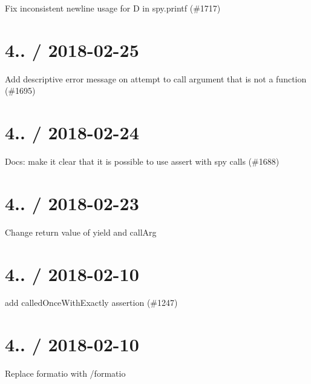 \begin{DoxyItemize}
\item Fix inconsistent newline usage for D in spy.\+printf (\#1717)
\end{DoxyItemize}

\section*{4.. / 2018-\/02-\/25 }


\begin{DoxyItemize}
\item Add descriptive error message on attempt to call argument that is not a function (\#1695)
\end{DoxyItemize}

\section*{4.. / 2018-\/02-\/24 }


\begin{DoxyItemize}
\item Docs\+: make it clear that it is possible to use assert with spy calls (\#1688)
\end{DoxyItemize}

\section*{4.. / 2018-\/02-\/23 }


\begin{DoxyItemize}
\item Change return value of yield and call\+Arg
\end{DoxyItemize}

\section*{4.. / 2018-\/02-\/10 }


\begin{DoxyItemize}
\item add called\+Once\+With\+Exactly assertion (\#1247)
\end{DoxyItemize}

\section*{4.. / 2018-\/02-\/10 }


\begin{DoxyItemize}
\item Replace formatio with /formatio
\end{DoxyItemize}

